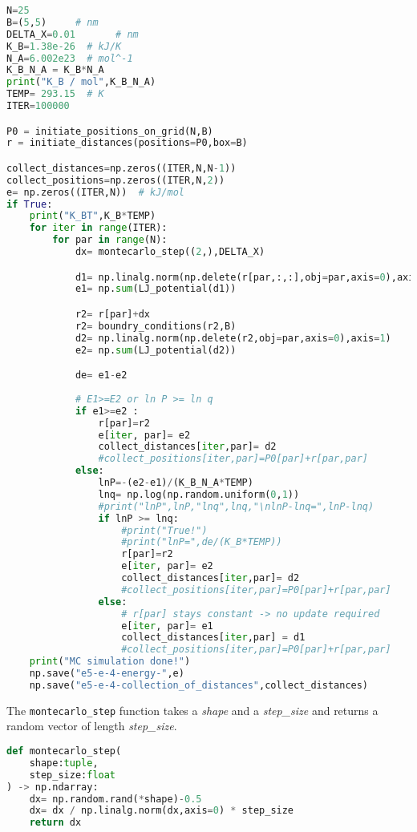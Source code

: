 \documentclass{article}[a4paper]
\begin{document}
\begin{lstlisting}[language=Python] 
N=25            
B=(5,5)     # nm
DELTA_X=0.01       # nm
K_B=1.38e-26  # kJ/K
N_A=6.002e23  # mol^-1
K_B_N_A = K_B*N_A
print("K_B / mol",K_B_N_A)
TEMP= 293.15  # K
ITER=100000

P0 = initiate_positions_on_grid(N,B)
r = initiate_distances(positions=P0,box=B)

collect_distances=np.zeros((ITER,N,N-1))
collect_positions=np.zeros((ITER,N,2))
e= np.zeros((ITER,N))  # kJ/mol
if True:
    print("K_BT",K_B*TEMP)
    for iter in range(ITER):
        for par in range(N):
            dx= montecarlo_step((2,),DELTA_X)

            d1= np.linalg.norm(np.delete(r[par,:,:],obj=par,axis=0),axis=1)
            e1= np.sum(LJ_potential(d1))

            r2= r[par]+dx 
            r2= boundry_conditions(r2,B)
            d2= np.linalg.norm(np.delete(r2,obj=par,axis=0),axis=1)
            e2= np.sum(LJ_potential(d2))

            de= e1-e2
            
            # E1>=E2 or ln P >= ln q
            if e1>=e2 :
                r[par]=r2
                e[iter, par]= e2
                collect_distances[iter,par]= d2
                #collect_positions[iter,par]=P0[par]+r[par,par]
            else:
                lnP=-(e2-e1)/(K_B_N_A*TEMP)
                lnq= np.log(np.random.uniform(0,1))
                #print("lnP",lnP,"lnq",lnq,"\nlnP-lnq=",lnP-lnq)
                if lnP >= lnq:
                    #print("True!")
                    #print("lnP=",de/(K_B*TEMP))
                    r[par]=r2
                    e[iter, par]= e2
                    collect_distances[iter,par]= d2
                    #collect_positions[iter,par]=P0[par]+r[par,par]
                else:
                    # r[par] stays constant -> no update required 
                    e[iter, par]= e1 
                    collect_distances[iter,par] = d1
                    #collect_positions[iter,par]=P0[par]+r[par,par]
    print("MC simulation done!")
    np.save("e5-e-4-energy-",e)
    np.save("e5-e-4-collection_of_distances",collect_distances)
\end{lstlisting}\label{ll:MCMCMI}

The \texttt{montecarlo\_step} function takes a \textit{shape} and a \textit{step\_size} and returns a random vector of length \textit{step\_size}.
\begin{lstlisting}[language=Python]
def montecarlo_step(
    shape:tuple,
    step_size:float
) -> np.ndarray:
    dx= np.random.rand(*shape)-0.5
    dx= dx / np.linalg.norm(dx,axis=0) * step_size
    return dx
\end{lstlisting}
\end{document}
